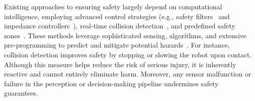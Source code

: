 Existing approaches to ensuring safety largely depend on computational intelligence, employing advanced control strategies (e.g., safety filters~\citep{ames2016control} and impedance controllers~\citep{khatib1987unified}), real-time collision detection~\citep{haddadin2017robot}, and predefined safety zones~\citep{zhao2024potential}. These methods leverage sophisticated sensing, algorithms, and extensive pre-programming to predict and mitigate potential hazards~\citep{fragapane2021planning}. For instance, collision detection improves safety by stopping or slowing the robot upon contact. Although this measure helps reduce the risk of serious injury, it is inherently reactive and cannot entirely eliminate harm. Moreover, any sensor malfunction or failure in the perception or decision-making pipeline undermines safety guarantees.

